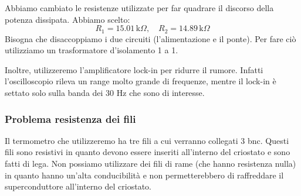 \documentclass[../main/main.tex]{subfiles}
\begin{document}



Abbiamo cambiato le resistenze utilizzate per far quadrare il discorso della potenza dissipata. Abbiamo scelto:
\begin{equation*}
  R_1 = 15.01 \, \text{k} \Omega, \quad  R_2 = 14.89 \, \text{k} \Omega
\end{equation*}
Bisogna che disaccoppiamo i due circuiti (l'alimentazione e il ponte). Per fare ciò utilizziamo un trasformatore d'isolamento 1 a 1.

Inoltre, utilizzeremo l'amplificatore lock-in per ridurre il rumore. Infatti l'oscilloscopio rileva un range molto grande di frequenze, mentre il lock-in è settato solo sulla banda dei 30 Hz che sono di interesse.


\subsubsection{Problema resistenza dei fili}

Il termometro che utilizzeremo ha tre fili a cui verranno collegati 3 bnc. Questi fili sono resistivi in quanto devono essere inseriti all'interno del criostato e sono fatti di lega. Non possiamo utilizzare dei fili di rame (che hanno resistenza nulla) in quanto hanno un'alta conducibilità e non permetterebbero di raffreddare il superconduttore all'interno del criostato.
\end{document}
